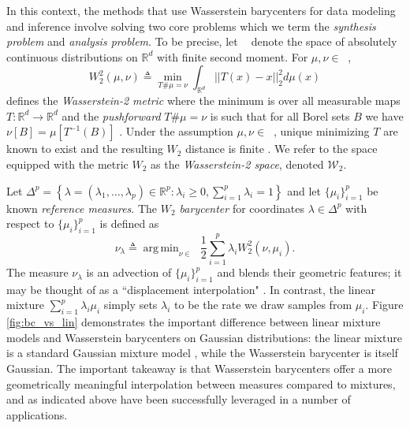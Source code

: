 \documentclass[nohyperref]{article}
\DeclareMathOperator*{\argmin}{arg\,min}
\DeclareMathOperator{\Pac}{\mathcal{P}_{2,ac}(\mathbb{R}^d)}
\theoremstyle{definition}
\begin{document}
In this context, the methods that use Wasserstein barycenters for data modeling and inference involve solving two core problems which we term the \emph{synthesis problem} and \emph{analysis problem}. To be precise, let $\Pac$ denote the space of absolutely continuous distributions on $\mathbb{R}^d$ with finite second moment.  For $\mu, \nu \in \Pac$,
\begin{equation} \label{eq:wass_dist}
    W_2^2(\mu,\nu) \triangleq \min_{T\#\mu = \nu} \int_{\mathbb{R}^{d}} ||T(x) - x||_2^2 d\mu(x)
\end{equation}
defines the \emph{Wasserstein-2 metric} where the minimum is over all measurable maps $T:\mathbb{R}^d \rightarrow \mathbb{R}^d$ and the \emph{pushforward} $T\#\mu = \nu$ is such that for all Borel sets $B$ we have $\nu[B] = \mu[T^{-1}(B)]$  \citep{villani2003topics, santambrogio2015optimal}. Under the assumption $\mu,\nu\in\Pac$, unique minimizing $T$ are known to exist and the resulting $W_{2}$ distance is finite \citep{villani2003topics}.  We refer to the space $\Pac$ equipped with the metric $W_{2}$ as the \emph{Wasserstein-2 space}, denoted $\mathcal{W}_{2}$.

Let $\Delta^p = \left \{\lambda=(\lambda_{1},\dots,\lambda_{p}) \in \mathbb{R}^p : \lambda_{i} \geq 0, \sum_{i=1}^p \lambda_i = 1 \right \}$ and let $\{\mu_{i}\}_{i=1}^{p}$ be known \emph{reference measures}. The \emph{$W_{2}$ barycenter} for coordinates $\lambda\in\Delta^{p}$ with respect to $\{\mu_{i}\}_{i=1}^{p}$ is defined as
\begin{equation} \label{eq:barycenter}
    \nu_{\lambda} \triangleq \argmin_{\nu\in \Pac} \frac{1}{2}\sum_{i=1}^p \lambda_i W_2^2(\nu, \mu_i).
\end{equation}
The measure $\nu_{\lambda}$ is an advection of $\{\mu_i\}_{i=1}^{p}$ and blends their geometric features; it may be thought of as a ``displacement interpolation" \citep{mccann1997convexity, villani2003topics}.  In contrast, the linear mixture $\sum_{i=1}^{p} \lambda_i \mu_i$ simply sets $\lambda_{i}$ to be the rate we draw samples from $\mu_i$.  Figure \ref{fig:bc_vs_lin} demonstrates the important difference between linear mixture models and Wasserstein barycenters on Gaussian distributions: the linear mixture is a standard Gaussian mixture model \citep{murphy2012machine}, while the Wasserstein barycenter is itself Gaussian. The important takeaway is that Wasserstein barycenters offer a more geometrically meaningful interpolation between measures compared to mixtures, and as indicated above have been successfully leveraged in a number of applications.
\end{document}
